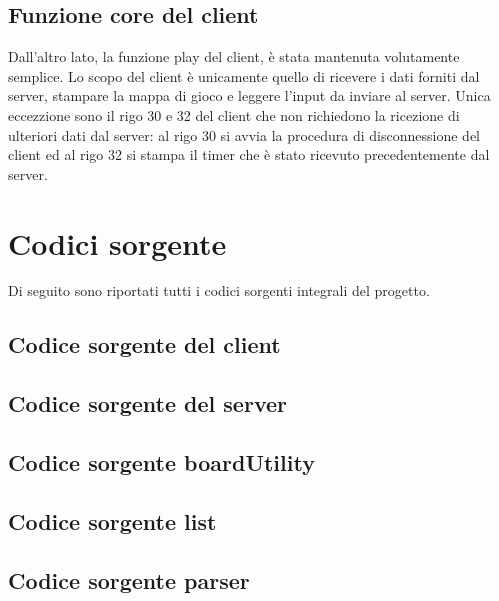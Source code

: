 \documentclass[a4paper]{article}
\begin{document}
\subsection{Funzione core del client}
Dall'altro lato, la funzione play del client, è stata mantenuta volutamente semplice.
Lo scopo del client è unicamente quello di ricevere i dati forniti dal server, stampare la mappa di gioco e leggere l'input da inviare al server.
Unica eccezzione sono il rigo 30 e 32 del client che non richiedono la ricezione di ulteriori dati dal server: al rigo 30 si avvia la procedura di disconnessione del client ed al rigo 32 si stampa il timer che è stato ricevuto precedentemente dal server.
\pagebreak


\pagebreak

\appendix
\section{Codici sorgente}
Di seguito sono riportati tutti i codici sorgenti integrali del progetto.
\subsection{Codice sorgente del client}

\subsection{Codice sorgente del server}

\subsection{Codice sorgente boardUtility}


\subsection{Codice sorgente list}


\subsection{Codice sorgente parser}


\pagebreak
\lstlistoflistings
\end{document}

